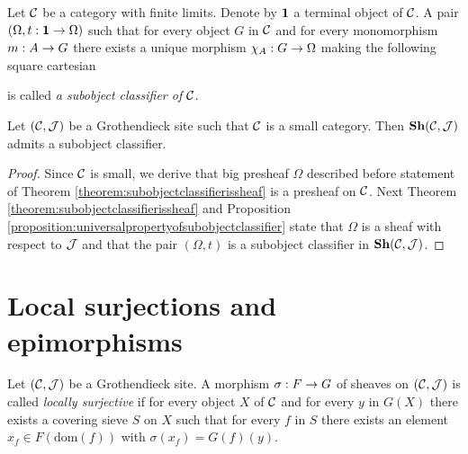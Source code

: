 \begin{definition}
Let ${\mathcal C}$ be a category with finite limits. Denote by $\mathbf{1}$ a terminal object of ${\mathcal C}$. A pair $(\Omega, t:\mathbf{1}\rightarrow \Omega)$ such that for every object $G$ in ${\mathcal C}$ and for every monomorphism $m:A\rightarrow  G$ there exists a unique morphism $\chi_A:G\rightarrow \Omega$ making the following square cartesian
\begin{center}
\end{center}
is called \textit{a subobject classifier of ${\mathcal C}$}.
\end{definition}

\begin{corollary}
Let $({\mathcal C},{\mathcal J})$ be a Grothendieck site such that ${\mathcal C}$ is a small category. Then $\mathbf{Sh}({\mathcal C},{\mathcal J})$ admits a subobject classifier.
\end{corollary}
\begin{proof}
Since ${\mathcal C}$ is small, we derive that big presheaf $\Omega$ described before statement of Theorem \ref{theorem:subobjectclassifierissheaf} is a presheaf on ${\mathcal C}$. Next Theorem \ref{theorem:subobjectclassifierissheaf} and Proposition \ref{proposition:universalpropertyofsubobjectclassifier} state that $\Omega$ is a sheaf with respect to ${\mathcal J}$ and that the pair $(\Omega, t)$ is a subobject classifier in $\mathbf{Sh}({\mathcal C},{\mathcal J})$.
\end{proof}

\section{Local surjections and epimorphisms}

\begin{definition}
Let $({\mathcal C},{\mathcal J})$ be a Grothendieck site. A morphism $\sigma:F\rightarrow G$ of sheaves on $({\mathcal C},{\mathcal J})$ is called \textit{locally surjective} if for every object $X$ of ${\mathcal C}$ and for every $y$ in $G(X)$ there exists a covering sieve $S$ on $X$ such that for every $f$ in $S$ there exists an element $x_f\in F\left(\mathrm{dom}(f)\right)$ with $\sigma(x_f) = G(f)(y)$.
\end{definition}

